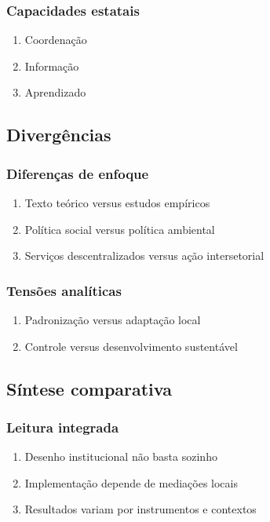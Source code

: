 \documentclass[12pt,a4paper]{article}
\begin{document}
\subsubsection{Capacidades estatais}
\label{sec:orgaa9f9ef}
\begin{enumerate}
\item Coordenação
\label{sec:org1512030}
\item Informação
\label{sec:org5d2d332}
\item Aprendizado
\label{sec:org1c51819}
\end{enumerate}
\subsection{Divergências}
\label{sec:orgf8b4b4e}
\subsubsection{Diferenças de enfoque}
\label{sec:org4b189d2}
\begin{enumerate}
\item Texto teórico versus estudos empíricos
\label{sec:orgb9c9f47}
\item Política social versus política ambiental
\label{sec:org26cc23a}
\item Serviços descentralizados versus ação intersetorial
\label{sec:org499b564}
\end{enumerate}
\subsubsection{Tensões analíticas}
\label{sec:orgadb9f0c}
\begin{enumerate}
\item Padronização versus adaptação local
\label{sec:org99eefca}
\item Controle versus desenvolvimento sustentável
\label{sec:org83e9915}
\end{enumerate}
\subsection{Síntese comparativa}
\label{sec:org4da67e0}
\subsubsection{Leitura integrada}
\label{sec:org581f8c1}
\begin{enumerate}
\item Desenho institucional não basta sozinho
\label{sec:orgec8e2c5}
\item Implementação depende de mediações locais
\label{sec:org786f5b1}
\item Resultados variam por instrumentos e contextos
\label{sec:org2ff7a15}
\end{enumerate}
\end{document}
